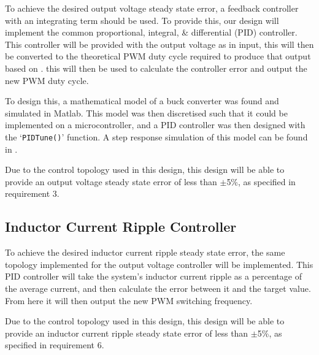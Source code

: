 To achieve the desired output voltage steady state error, a feedback controller with an integrating term should be used. To provide this, our design will implement the common proportional, integral, \& differential (PID) controller. This controller will be provided with the output voltage as in input, this will then be converted to the theoretical PWM duty cycle required to produce that output based on . this will then be used to calculate the controller error and output the new PWM duty cycle.

To design this, a mathematical model of a buck converter \cite{Patil2015} was found and simulated in Matlab. This model was then discretised such that it could be implemented on a microcontroller, and a PID controller was then designed with the `\lstinline{PIDTune()}' function. A step response simulation of this model can be found in . 

Due to the control topology used in this design, this design will be able to provide an output voltage steady state error of less than $\pm$5\%, as specified in requirement 3.

\subsection{Inductor Current Ripple Controller}\label{S:ripple_control_design}

To achieve the desired inductor current ripple steady state error, the same topology implemented for the output voltage controller will be implemented. This PID controller will take the system's inductor current ripple as a percentage of the average current, and then calculate the error between it and the target value. From here it will then output the new PWM switching frequency. 

Due to the control topology used in this design, this design will be able to provide an inductor current ripple steady state error of less than $\pm$5\%, as specified in requirement 6.





